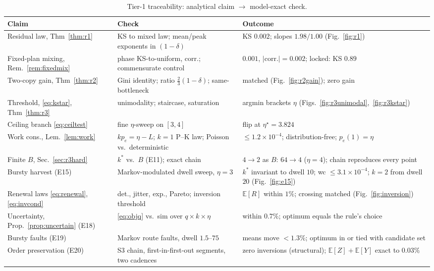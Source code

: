 \documentclass[twocolumn,3p,times,procedia]{elsarticle}
\theoremstyle{plain}
\theoremstyle{remark}
\newcommand{\E}{\mathbb{E}}
\newcommand{\peff}{p_e}
\newcommand{\kstar}{k^{\ast}}
\begin{document}
\begin{table}[t]
\caption{Tier-1 traceability: analytical claim $\to$ model-exact check.}
\label{tab:tier1}
\centering
\renewcommand{\arraystretch}{1.18}
\setlength{\tabcolsep}{3pt}
\footnotesize
\begin{tabular}{>{\raggedright\arraybackslash}p{}>{\raggedright\arraybackslash}p{}>{\raggedright\arraybackslash}p{}}
\hline
Claim & Check & Outcome \\
\hline
Residual law, Thm~\ref{thm:r1} & KS to mixed law; mean/peak exponents in $(1{-}\delta)$ & KS $0.002$; slopes $1.98/1.00$ (Fig.~\ref{fig:r1}) \\
Fixed-plan mixing, Rem.~\ref{rem:fixedmix} & phase KS-to-uniform, corr.; commensurate control & $0.001$, $|\text{corr.}|{=}0.002$; locked: KS $0.89$ \\
Two-copy gain, Thm~\ref{thm:r2} & Gini identity; ratio $\tfrac23(1{-}\delta)$; same-bottleneck & matched (Fig.~\ref{fig:r2gain}); zero gain \\
Threshold, \eqref{eq:kstar}, Thm~\ref{thm:r3} & unimodality; staircase, saturation & argmin brackets $\eta$ (Figs.~\ref{fig:r3unimodal},~\ref{fig:r3kstar}) \\
Ceiling branch \eqref{eq:ceiltest} & fine $\eta$-sweep on $[3,4]$ & flip at $\eta^\star{=}3.824$ \\
Work cons., Lem.~\ref{lem:work} & $k\peff{=}\eta{-}L$; $k{=}1$ P--K law; Poisson vs.\ deterministic & $\le\!1.2{\times}10^{-4}$; distribution-free; $\peff(1){=}\eta$ \\
Finite $B$, Sec.~\ref{sec:r3hard} & $\kstar$ vs.\ $B$ (E11); exact chain & $4\to2$ as $B$: $64\to4$ ($\eta{=}4$); chain reproduces every point \\
Bursty harvest (E15) & Markov-modulated dwell sweep, $\eta{=}3$ & $\kstar$ invariant to dwell $10$; wc $\le\!3.1{\times}10^{-4}$; $k{=}2$ from dwell $20$ (Fig.~\ref{fig:e15}) \\
Renewal laws \eqref{eq:renewal},\newline\eqref{eq:invcond} & det., jitter, exp., Pareto; inversion threshold & $\E[R]$ within $1\%$; crossing matched (Fig.~\ref{fig:inversion}) \\
Uncertainty, Prop.~\ref{prop:uncertain} (E18) & \eqref{eq:objq} vs.\ sim over $q{\times}k{\times}\eta$ & within $0.7\%$; optimum equals the rule's choice \\
Bursty faults (E19) & Markov route faults, dwell $1.5$--$75$ & means move $<1.3\%$; optimum in or tied with candidate set \\
Order preservation (E20) & S3 chain, first-in-first-out segments, two cadences & zero inversions (structural); $\E[Z]{+}\E[Y]$ exact to $0.03\%$ \\
\hline
\end{tabular}
\end{table}
\end{document}
